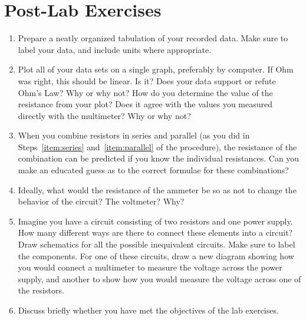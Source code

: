 \documentclass[12pt]{article}
\begin{document}
\newpage

\section*{Post-Lab Exercises}

\begin{enumerate}
\item Prepare a neatly organized tabulation of your recorded data.
  Make sure to label your data, and include units where appropriate.  
\item Plot all of your data sets on a single graph, preferably by
  computer.  If Ohm was right, this should be linear.  Is it?  Does
  your data support or refute Ohm's Law?  Why or why not?  How do you
  determine the value of the resistance from your plot?  Does it agree
  with the values you measured directly with the multimeter?  Why or
  why not?
\item When you combine resistors in series and parallel (as you did in
  Steps~\ref{item:series} and~\ref{item:parallel} of the procedure),
  the resistance of the combination can be predicted if you know the
  individual resistances.  Can you make an educated guess as to the
  correct formulae for these combinations?
\item Ideally, what would the resistance of the ammeter be so as not
  to change the behavior of the circuit?  The voltmeter?  Why?
\item Imagine you have a circuit consisting of two resistors and one
  power supply.  How many different ways are there to connect these
  elements into a circuit?  Draw schematics for all the possible
  inequivalent circuits.  Make sure to label the components.  For one
  of these circuits, draw a new diagram showing how you would connect
  a multimeter to measure the voltage across the power supply, and
  another to show how you would measure the voltage across one of the
  resistors.
\item Discuss briefly whether you have met the objectives of the lab
  exercises.  
\end{enumerate}
\end{document}
